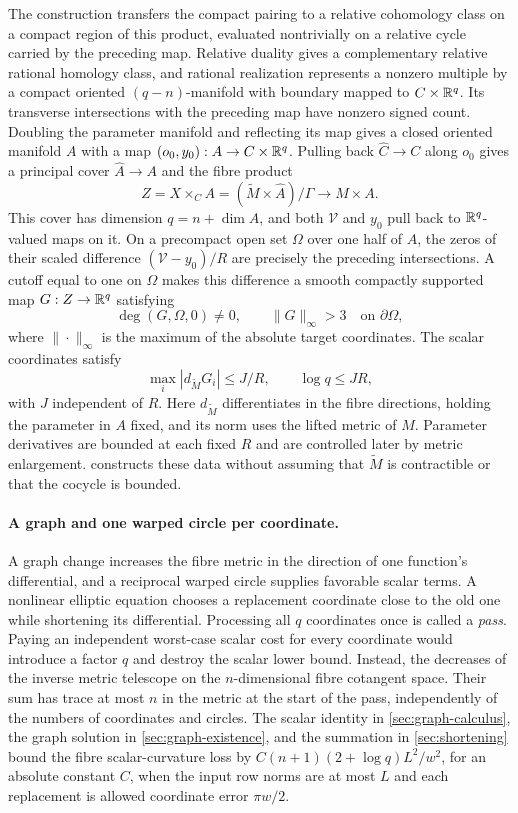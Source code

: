The construction transfers the compact pairing to a relative cohomology class
on a compact region of this product, evaluated nontrivially on a relative
cycle carried by the preceding map. Relative duality gives a complementary
relative rational homology class, and rational realization represents a nonzero multiple
by a compact oriented $(q-n)$-manifold with boundary mapped to
$C\times\mathbb R^q$. Its transverse intersections with the preceding map have
nonzero signed count. Doubling the parameter manifold and reflecting its map
gives a closed oriented manifold $A$ with a map $(o_0,y_0):A\to C\times\mathbb R^q$.
Pulling back $\widehat C\to C$ along $o_0$ gives a principal cover
$\widehat A\to A$ and the fibre product
\[
 Z=X\times_C A=(\widetilde M\times\widehat A)/\Gamma
       \longrightarrow M\times A.
\]
This cover has dimension $q=n+\dim A$, and both $\mathcal V$ and $y_0$ pull
back to $\mathbb R^q$-valued maps on it.
On a precompact open set $\Omega$ over one half of $A$, the zeros of their
scaled difference $(\mathcal V-y_0)/R$ are precisely the preceding
intersections. A cutoff equal to one on $\Omega$ makes this difference a
smooth compactly supported map $G:Z\to\mathbb R^q$ satisfying
\[
 \deg(G,\Omega,0)\ne0,
 \qquad \|G\|_\infty>3\quad\text{on }\partial\Omega,
\]
where $\|\cdot\|_\infty$ is the maximum of the absolute target coordinates.
The scalar coordinates satisfy
\begin{equation}\label{eq:introduction-data}
 \max_i|d_{\widetilde M}G_i|\le J/R,
 \qquad \log q\le JR,
\end{equation}
with $J$ independent of $R$. Here $d_{\widetilde M}$ differentiates in the
fibre directions, holding the parameter in $A$ fixed, and its norm uses the
lifted metric of $M$. Parameter derivatives are bounded at each fixed $R$
and are controlled later by metric enlargement.
 constructs these data without assuming that
$\widetilde M$ is contractible or that the cocycle is bounded.

\paragraph{A graph and one warped circle per coordinate.}
A graph change increases the fibre metric in the direction of one function's
differential, and a reciprocal warped circle supplies favorable scalar terms.
A nonlinear elliptic equation chooses a replacement coordinate close to the
old one while shortening its differential. Processing all $q$ coordinates
once is called a \emph{pass}. Paying an independent worst-case scalar cost
for every coordinate would introduce a factor $q$ and destroy the scalar
lower bound. Instead, the decreases of the inverse metric telescope on the
$n$-dimensional fibre cotangent space. Their sum has trace at most $n$ in the
metric at the start of the pass, independently of the numbers of coordinates
and circles. The scalar identity in \cref{sec:graph-calculus}, the graph
solution in \cref{sec:graph-existence}, and the summation in
\cref{sec:shortening} bound the fibre scalar-curvature loss by
$C(n+1)(2+\log q)L^2/w^2$, for an absolute constant $C$, when the input row
norms are at most $L$ and each replacement is allowed coordinate error
$\pi w/2$.

